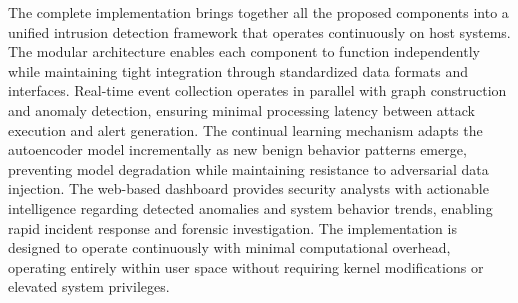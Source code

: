 The complete implementation brings together all the proposed components into a unified intrusion detection framework that operates continuously on host systems. The modular architecture enables each component to function independently while maintaining tight integration through standardized data formats and interfaces. Real-time event collection operates in parallel with graph construction and anomaly detection, ensuring minimal processing latency between attack execution and alert generation. The continual learning mechanism adapts the autoencoder model incrementally as new benign behavior patterns emerge, preventing model degradation while maintaining resistance to adversarial data injection. The web-based dashboard provides security analysts with actionable intelligence regarding detected anomalies and system behavior trends, enabling rapid incident response and forensic investigation. The implementation is designed to operate continuously with minimal computational overhead, operating entirely within user space without requiring kernel modifications or elevated system privileges. 




